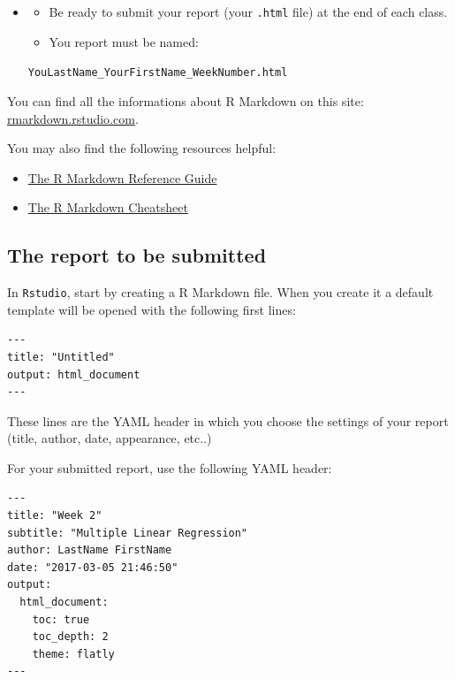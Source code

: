 \documentclass[]{book}
\providecommand{\tightlist}{%
  \setlength{\itemsep}{0pt}\setlength{\parskip}{0pt}}
\newenvironment{rmdblock}[1]
  {\begin{shaded*}
  \begin{itemize}
  \renewcommand{\labelitemi}{
    \raisebox{-.7\height}[0pt][0pt]{
      {\setkeys{Gin}{width=2em,keepaspectratio}\texttt{[image: img/icons/\#1]}}
    }
  }
  \item
  }
  {
  \end{itemize}
  \end{shaded*}
  }
\newenvironment{rmdcaution}
  {\begin{rmdblock}{caution}}
  {\end{rmdblock}}
\begin{document}
\begin{rmdcaution}
\begin{itemize}
\item
  Be ready to submit your report (your \texttt{.html} file) at the end
  of each class.
\item
  You report must be named:
\end{itemize}

\texttt{YouLastName\_YourFirstName\_WeekNumber.html}
\end{rmdcaution}

You can find all the informations about R Markdown on this site:
\href{http://rmarkdown.rstudio.com/lesson-1.html}{rmarkdown.rstudio.com}.

You may also find the following resources helpful:

\begin{itemize}
\tightlist
\item
  \href{https://www.rstudio.com/wp-content/uploads/2015/03/rmarkdown-reference.pdf}{The
  R Markdown Reference Guide}
\item
  \href{https://www.rstudio.com/wp-content/uploads/2016/03/rmarkdown-cheatsheet-2.0.pdf}{The
  R Markdown Cheatsheet}
\end{itemize}

\subsection*{The report to be
submitted}\label{the-report-to-be-submitted}

In \texttt{Rstudio}, start by creating a R Markdown file. When you
create it a default template will be opened with the following first
lines:

\begin{verbatim}
---
title: "Untitled"
output: html_document
---
\end{verbatim}

These lines are the YAML header in which you choose the settings of your
report (title, author, date, appearance, etc..)

For your submitted report, use the following YAML header:

\begin{verbatim}
---
title: "Week 2"
subtitle: "Multiple Linear Regression"
author: LastName FirstName
date: "2017-03-05 21:46:50"
output:
  html_document:
    toc: true
    toc_depth: 2
    theme: flatly
---
\end{verbatim}
\end{document}
